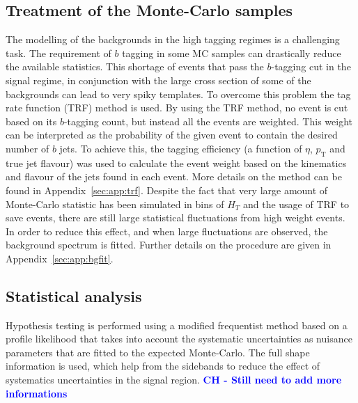 \documentclass[a4paper,11pt]{article}
\newcommand{\CH}[1] {\textbf{\textcolor{blue}{CH - #1}}}
\newcommand{\pt}{\ensuremath{p_{\text{T}}}}
\newcommand*{\hht}{\ensuremath{H_{\ensuremath{T}}}}
\begin{document}
\subsection{Treatment of the Monte-Carlo samples}
\label{subsec:mctreat}
The modelling of the backgrounds in the high tagging regimes is a challenging task. The requirement of $b$ tagging in some MC samples can drastically reduce the available statistics.
This shortage of events that pass the $b$-tagging cut in the signal regime, in conjunction with the large cross section of some of the backgrounds can lead to very spiky templates.
To overcome this problem the tag rate function (TRF) method is used. By using the TRF method, no event is cut based on its $b$-tagging count, but instead all the events are weighted. 
This weight can be interpreted as the probability of the given event to contain the desired number of $b$ jets.
To achieve this, the tagging efficiency (a function of $\eta$, $\pt$ and true jet flavour) was
used to calculate the event weight based on the kinematics and flavour of the jets found in each event. More details on the method can be found in Appendix~\ref{sec:app:trf}.
Despite the fact that very large amount of Monte-Carlo statistic has been simulated in bins of $\hht$
and the usage of TRF to save events, there are still large statistical fluctuations from high weight events.
In order to reduce this effect, and when large fluctuations are observed, the background spectrum is fitted. Further details on the procedure are given in Appendix~\ref{sec:app:bgfit}.

\subsection{Statistical analysis}
Hypothesis testing is performed using a modified frequentist method based on a profile likelihood that takes into account the systematic uncertainties as nuisance parameters that are fitted to the expected Monte-Carlo. The full shape information is used, which help from the sidebands to reduce the effect of systematics uncertainties in the signal region.
\CH{Still need to add more informations}

\end{document}
